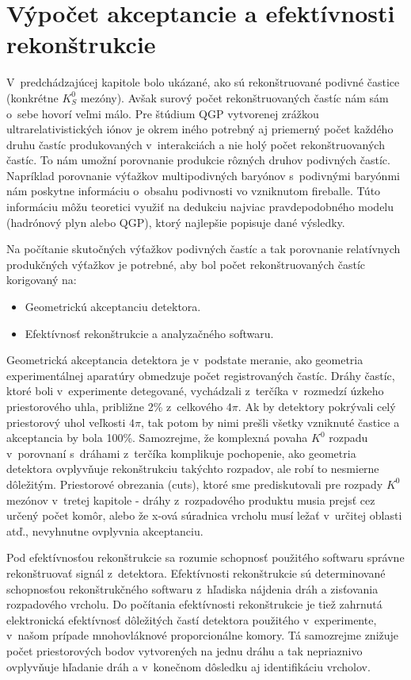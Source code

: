 
%
\chapter{Výpočet akceptancie a efektívnosti rekonštrukcie}
V~predchádzajúcej kapitole bolo ukázané, ako sú rekonštruované podivné častice
(konkrétne $K^{0}_{S}$ mezóny). Avšak surový počet rekonštruovaných častíc
nám  sám o~sebe hovorí veľmi málo. Pre štúdium QGP vytvorenej zrážkou
ultrarelativistických iónov je okrem iného potrebný aj priemerný počet
každého druhu častíc produkovaných v~interakciách a nie holý počet
rekonštruovaných častíc. To nám umožní porovnanie produkcie rôzných druhov
podivných častíc. Napríklad porovnanie výťažkov multipodivných baryónov 
s~podivnými baryónmi nám poskytne informáciu o~obsahu podivnosti vo
vzniknutom  fireballe. Túto informáciu môžu teoretici využiť na dedukciu
najviac pravdepodobného modelu (hadrónový plyn alebo QGP), ktorý najlepšie
popisuje dané výsledky.

Na počítanie skutočných výťažkov podivných častíc  a tak porovnanie
relatívnych produkčných výťažkov je potrebné, aby bol počet rekonštruovaných
častíc korigovaný na:
\begin{itemize}
  \item{Geometrickú akceptanciu detektora.}
  \item{Efektívnosť rekonštrukcie a analyzačného softwaru.}
\end{itemize}
Geometrická akceptancia detektora je v~podstate meranie, ako geometria
experimentálnej aparatúry obmedzuje počet registrovaných častíc. Dráhy
častíc, ktoré boli v~experimente detegované, vychádzali z~terčíka v~rozmedzí
úzkeho priestorového uhla, približne 2\% z~celkového  $4\pi$. Ak by detektory
pokrývali celý priestorový uhol veľkosti $4\pi$, tak potom by nimi prešli
všetky vzniknuté častice a akceptancia by bola 100\%. Samozrejme, že
komplexná povaha $K^{0}$ rozpadu v~porovnaní s~dráhami z~terčíka komplikuje
pochopenie, ako geometria detektora ovplyvňuje rekonštrukciu takýchto
rozpadov, ale robí to nesmierne dôležitým. Priestorové obrezania (cuts),
ktoré sme prediskutovali pre rozpady $K^{0}$ mezónov v~tretej kapitole -
dráhy z~rozpadového produktu musia prejsť cez určený počet komôr,
alebo že x-ová súradnica vrcholu musí ležať v~určitej oblasti atď.,
nevyhnutne ovplyvnia akceptanciu.

Pod efektívnosťou rekonštrukcie sa rozumie schopnosť  použitého softwaru
správne rekonštruovať signál z~detektora. Efektívnosti rekonštrukcie
sú determinované schopnosťou  rekonštrukčného softwaru  z~hľadiska nájdenia
dráh a zisťovania rozpadového vrcholu. Do počítania efektívnosti
rekonštrukcie je tiež zahrnutá  elektronická efektívnosť dôležitých častí
detektora použitého v~experimente, v~našom prípade mnohovláknové
proporcionálne komory. Tá samozrejme znižuje počet priestorových bodov 
vytvorených na jednu dráhu a tak nepriaznivo ovplyvňuje hľadanie dráh a
v~konečnom dôsledku aj identifikáciu vrcholov.

